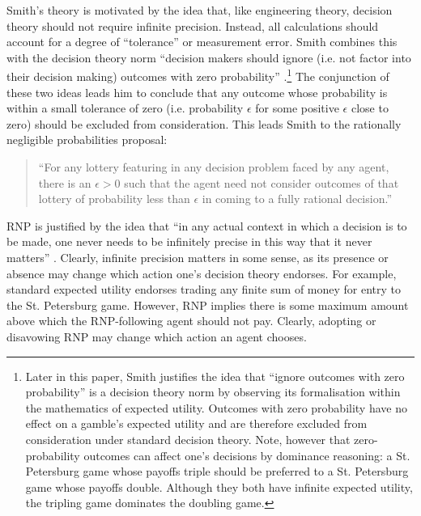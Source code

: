 \documentclass{article}
\begin{document}
Smith's theory is motivated by the idea that, like engineering theory, decision theory should not require infinite precision. Instead, all calculations should account for a degree of ``tolerance'' or measurement error. Smith combines this with the decision theory norm ``decision makers should ignore (i.e. not factor into their decision making) outcomes with zero probability'' \citep[pg. 472]{smith2014evaluative}.\footnote{Later in this paper, Smith justifies the idea that ``ignore outcomes with zero probability'' is a decision theory norm by observing its formalisation within the mathematics of expected utility. Outcomes with zero probability have no effect on a gamble's expected utility and are therefore excluded from consideration under standard decision theory. Note, however that zero-probability outcomes can affect one's decisions by dominance reasoning: a St. Petersburg game whose payoffs triple should be preferred to a St. Petersburg game whose payoffs double. Although they both have infinite expected utility, the tripling game dominates the doubling game.} The conjunction of these two ideas leads him to conclude that any outcome whose probability is within a small tolerance of zero (i.e. probability \(\epsilon\) for some positive \(\epsilon\) close to zero) should be excluded from consideration. This leads Smith to the rationally negligible probabilities proposal:

\begin{quote}
\onehalfspacing
``For any lottery featuring in any decision problem faced by any agent, there is an \(\epsilon > 0\) such that the agent need not consider outcomes of that lottery of probability less than \(\epsilon\) in coming to a fully rational decision.'' \citep[pg. 472]{smith2014evaluative}
\end{quote}

\noindent
RNP is justified by the idea that ``in any actual context in which a decision is to be made, one never needs to be infinitely precise in this way \textemdash{} that it never matters'' \citep[pg. 474]{smith2014evaluative}. Clearly, infinite precision matters in some sense, as its presence or absence may change which action one's decision theory endorses. For example, standard expected utility endorses trading any finite sum of money for entry to the St. Petersburg game. However, RNP implies there is some maximum amount above which the RNP-following agent should not pay. Clearly, adopting or disavowing RNP may change which action an agent chooses.
\end{document}
